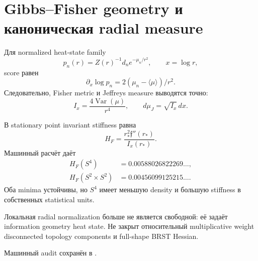 \chapter{Gibbs--Fisher geometry и каноническая radial measure}

Для normalized heat-state family
\begin{equation}
 p_n(r)=Z(r)^{-1}d_ne^{-\mu_n/r^2},
 \qquad x=\log r,
\end{equation}
score равен
\begin{equation}
 \partial_x\log p_n=2(\mu_n-\langle\mu\rangle)/r^2.
\end{equation}
Следовательно, Fisher metric и Jeffreys measure выводятся точно:
\begin{equation}
 \boxed{I_x=\frac{4\operatorname{Var}(\mu)}{r^4}},
 \qquad d\mu_J=\sqrt{I_x}\,dx.
\end{equation}

В stationary point invariant stiffness равна
\begin{equation}
 H_F=\frac{r_*^2\mathfrak f''(r_*)}{I_x(r_*)}.
\end{equation}
Машинный расчёт даёт
\begin{align}
 H_F(S^4)&=0.00588026822269\ldots,\\
 H_F(S^2\times S^2)&=0.00456099125215\ldots.
\end{align}
Оба minima устойчивы, но \(S^4\) имеет меньшую density и большую stiffness
в собственных statistical units.

\begin{theorem}
Локальная radial normalization больше не является свободной: её задаёт
information geometry heat state. Не закрыт относительный multiplicative
weight disconnected topology components и full-shape BRST Hessian.
\end{theorem}

Машинный audit сохранён в
.